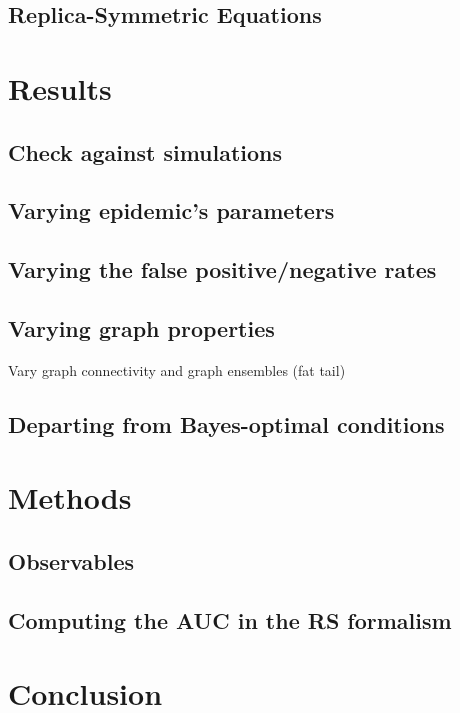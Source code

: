 \documentclass[a4paper, amsfonts, amssymb, amsmath, reprint, showkeys, nofootinbib, twoside, floatfix, pre,superscriptaddress]{revtex4-2}
\begin{document}
\subsection{Replica-Symmetric Equations}


\section{Results}
\subsection{Check against simulations}
\subsection{Varying epidemic's parameters}
\subsection{Varying the false positive/negative rates}
\subsection{Varying graph properties}
Vary graph connectivity and graph ensembles (fat tail)
\subsection{Departing from Bayes-optimal conditions}

\section{Methods}
\subsection{Observables}
\subsection{Computing the AUC in the RS formalism}

\section{Conclusion}
\end{document}

